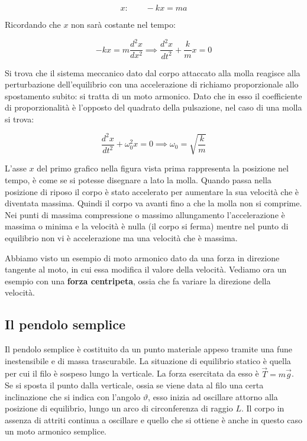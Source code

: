 \[
	x: \qquad -kx=ma
\]

Ricordando che $x$ non sarà costante nel tempo:

\[
	-kx=m\frac{d^2x}{dx^2} \implies \frac{d^2x}{dt^2}+\frac{k}{m}x=0
\]

Si trova che il sistema meccanico dato dal corpo attaccato alla molla reagisce alla perturbazione dell'equilibrio con una accelerazione di richiamo proporzionale allo spostamento subito: si tratta di un moto armonico. Dato che in esso il coefficiente di proporzionalità è l'opposto del quadrato della pulsazione, nel caso di una molla si trova:

\[
	\frac{d^2x}{dt^2}+\omega^2_0 x=0 \implies \omega_0=\sqrt{\frac{k}{m}}
\]

L'asse $x$ del primo grafico nella figura vista prima rappresenta la posizione nel tempo, è come se si potesse disegnare a lato la molla. Quando passa nella posizione di riposo il corpo è stato accelerato per aumentare la sua velocità che è diventata massima. Quindi il corpo va avanti fino a che la molla non si comprime.  Nei punti di massima compressione o massimo allungamento l'accelerazione è massima o minima e la velocità è nulla (il corpo si ferma) mentre nel punto di equilibrio non vi è accelerazione ma una velocità che è massima.

Abbiamo visto un esempio di moto armonico dato da una forza in direzione tangente al moto, in cui essa modifica il valore della velocità. Vediamo ora un esempio con una \textbf{forza centripeta}, ossia che fa variare la direzione della velocità.

\subsection{Il pendolo semplice}

Il pendolo semplice è costituito da un punto materiale appeso tramite una fune inestensibile e di massa trascurabile. La situazione di equilibrio statico è quella per cui il filo è sospeso lungo la verticale. La forza esercitata da esso è $\vec{T}=m\vec{g}$. Se si sposta il punto dalla verticale, ossia se viene data al filo una certa inclinazione che si indica con l'angolo $\vartheta$, esso inizia ad oscillare attorno alla posizione di equilibrio, lungo un arco di circonferenza di raggio $L$. Il corpo in assenza di attriti continua a oscillare e quello che si ottiene è anche in questo caso un moto armonico semplice.

